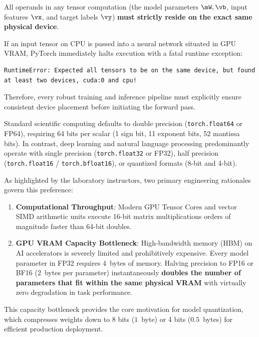 \documentclass[../labs.tex]{subfiles}
\begin{document}
\begin{examinsight}
All operands in any tensor computation (the model parameters $\mW, \vb$, input features $\vx$, and target labels $\vy$) \textbf{must strictly reside on the exact same physical device}. 

If an input tensor on CPU is passed into a neural network situated in GPU VRAM, PyTorch immediately halts execution with a fatal runtime exception:
\begin{lstlisting}[style=terminalOutput]
RuntimeError: Expected all tensors to be on the same device, but found at least two devices, cuda:0 and cpu!
\end{lstlisting}
Therefore, every robust training and inference pipeline must explicitly ensure consistent device placement before initiating the forward pass.
\end{examinsight}

\begin{deepdive}
Standard scientific computing defaults to double precision (\texttt{torch.float64} or FP64), requiring 64 bits per scalar (1 sign bit, 11 exponent bits, 52 mantissa bits). In contrast, deep learning and natural language processing predominantly operate with single precision (\texttt{torch.float32} or FP32), half precision (\texttt{torch.float16} / \texttt{torch.bfloat16}), or quantized formats (8-bit and 4-bit).

As highlighted by the laboratory instructors, two primary engineering rationales govern this preference:
\begin{enumerate}
    \item \textbf{Computational Throughput}: Modern GPU Tensor Cores and vector SIMD arithmetic units execute 16-bit matrix multiplications orders of magnitude faster than 64-bit doubles.
    \item \textbf{GPU VRAM Capacity Bottleneck}: High-bandwidth memory (HBM) on AI accelerators is severely limited and prohibitively expensive. Every model parameter in FP32 requires $4$~bytes of memory. Halving precision to FP16 or BF16 ($2$~bytes per parameter) instantaneously \textbf{doubles the number of parameters that fit within the same physical VRAM} with virtually zero degradation in task performance.
\end{enumerate}
This capacity bottleneck provides the core motivation for model quantization, which compresses weights down to 8 bits ($1$~byte) or 4 bits ($0.5$~bytes) for efficient production deployment.
\end{deepdive}
\end{document}
